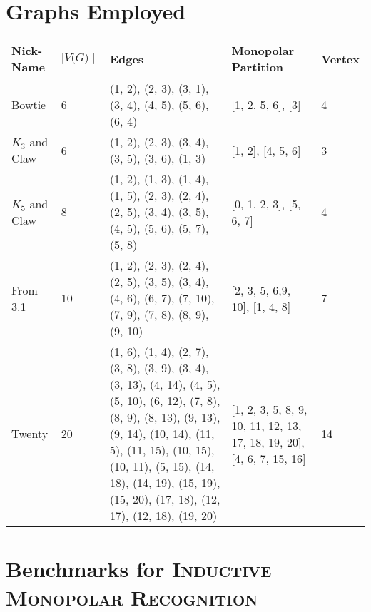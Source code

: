 \documentclass[11pt]{article}
\begin{document}

\section{Graphs Employed}
\label{subsec:graphs}

\begin{center}
\begin{tabu} to 0.9\textwidth { | X[l] X[c] X[c] X[c] X[c] | }
\hline
Nick-Name & $\mid\textit{V(G)}\mid$ & Edges & Monopolar Partition & Vertex \\
[0.5ex]
\hline
\hline
Bowtie & 6 & (1, 2), (2, 3), (3, 1), (3, 4), (4, 5), (5, 6), (6, 4) & [1, 2, 5, 6], [3] & 4 \\
[0.3ex]
\hline
$K_3$ and Claw & 6 & (1, 2), (2, 3), (3, 4), (3, 5), (3, 6), (1, 3) & [1, 2], [4, 5, 6] & 3 \\
[0.3ex]
\hline
$K_5$ and Claw & 8 & (1, 2), (1, 3), (1, 4), (1, 5), (2, 3), (2, 4), (2, 5), (3, 4), (3, 5), (4, 5), (5, 6), (5, 7), (5, 8) & [0, 1, 2, 3], [5, 6, 7] & 4 \\
[0.3ex]
\hline
From 3.1 & 10 & (1, 2), (2, 3), (2, 4), (2, 5), (3, 5), (3, 4), (4, 6), (6, 7), (7, 10), (7, 9), (7, 8), (8, 9), (9, 10) & [2, 3, 5, 6,9, 10], [1, 4, 8] & 7 \\
[0.3ex]
\hline
Twenty & 20 & (1, 6), (1, 4), (2, 7), (3, 8), (3, 9), (3, 4), (3, 13), (4, 14), (4, 5), (5, 10), (6, 12), (7, 8), (8, 9), (8, 13), (9, 13), (9, 14), (10, 14), (11, 5), (11, 15), (10, 15), (10, 11), (5, 15), (14, 18), (14, 19), (15, 19), (15, 20), (17, 18), (12, 17), (12, 18), (19, 20) & [1, 2, 3, 5, 8, 9, 10, 11, 12, 13, 17, 18, 19, 20], [4, 6, 7, 15, 16] & 14 \\
[0.3ex]
\hline
\end{tabu}
\end{center}

\section{Benchmarks for \textsc{Inductive Monopolar Recognition}}
\label{subsec:structural}
\end{document}
